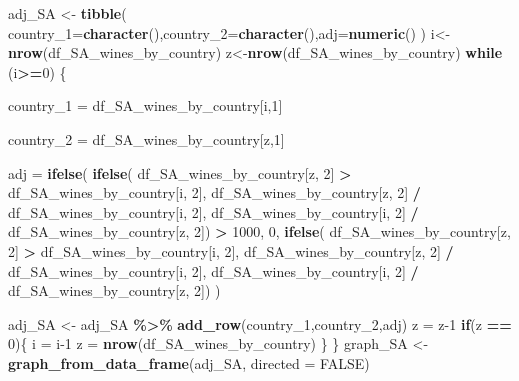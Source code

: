 \documentclass[
]{article}
\newenvironment{Shaded}{\begin{snugshade}}{\end{snugshade}}
\newcommand{\AttributeTok}[1]{\textcolor[rgb]{0.13,0.29,0.53}{#1}}
\newcommand{\ConstantTok}[1]{\textcolor[rgb]{0.56,0.35,0.01}{#1}}
\newcommand{\ControlFlowTok}[1]{\textcolor[rgb]{0.13,0.29,0.53}{\textbf{#1}}}
\newcommand{\DecValTok}[1]{\textcolor[rgb]{0.00,0.00,0.81}{#1}}
\newcommand{\FunctionTok}[1]{\textcolor[rgb]{0.13,0.29,0.53}{\textbf{#1}}}
\newcommand{\NormalTok}[1]{#1}
\newcommand{\OtherTok}[1]{\textcolor[rgb]{0.56,0.35,0.01}{#1}}
\newcommand{\SpecialCharTok}[1]{\textcolor[rgb]{0.81,0.36,0.00}{\textbf{#1}}}
\begin{document}
\begin{Shaded}
\begin{Highlighting}[]
\NormalTok{adj\_SA }\OtherTok{\textless{}{-}} \FunctionTok{tibble}\NormalTok{( }\AttributeTok{country\_1=}\FunctionTok{character}\NormalTok{(),}\AttributeTok{country\_2=}\FunctionTok{character}\NormalTok{(),}\AttributeTok{adj=}\FunctionTok{numeric}\NormalTok{()}
\NormalTok{)}
\NormalTok{i}\OtherTok{\textless{}{-}}\FunctionTok{nrow}\NormalTok{(df\_SA\_wines\_by\_country)}
\NormalTok{z}\OtherTok{\textless{}{-}}\FunctionTok{nrow}\NormalTok{(df\_SA\_wines\_by\_country)}
\ControlFlowTok{while}\NormalTok{ (i}\SpecialCharTok{\textgreater{}=}\DecValTok{0}\NormalTok{) \{}
  
  
\NormalTok{    country\_1 }\OtherTok{=}\NormalTok{ df\_SA\_wines\_by\_country[i,}\DecValTok{1}\NormalTok{]}
    
\NormalTok{    country\_2 }\OtherTok{=}\NormalTok{ df\_SA\_wines\_by\_country[z,}\DecValTok{1}\NormalTok{]}
    
\NormalTok{    adj }\OtherTok{=} 
      \FunctionTok{ifelse}\NormalTok{(      }
        \FunctionTok{ifelse}\NormalTok{(}
\NormalTok{          df\_SA\_wines\_by\_country[z, }\DecValTok{2}\NormalTok{] }\SpecialCharTok{\textgreater{}}\NormalTok{ df\_SA\_wines\_by\_country[i, }\DecValTok{2}\NormalTok{],}
\NormalTok{                 df\_SA\_wines\_by\_country[z, }\DecValTok{2}\NormalTok{] }\SpecialCharTok{/}\NormalTok{ df\_SA\_wines\_by\_country[i, }\DecValTok{2}\NormalTok{],}
\NormalTok{                 df\_SA\_wines\_by\_country[i, }\DecValTok{2}\NormalTok{] }\SpecialCharTok{/}\NormalTok{ df\_SA\_wines\_by\_country[z, }\DecValTok{2}\NormalTok{]) }\SpecialCharTok{\textgreater{}} \DecValTok{1000}\NormalTok{,}
        \DecValTok{0}\NormalTok{, }
        \FunctionTok{ifelse}\NormalTok{(}
\NormalTok{          df\_SA\_wines\_by\_country[z, }\DecValTok{2}\NormalTok{] }\SpecialCharTok{\textgreater{}}\NormalTok{ df\_SA\_wines\_by\_country[i, }\DecValTok{2}\NormalTok{],}
\NormalTok{                 df\_SA\_wines\_by\_country[z, }\DecValTok{2}\NormalTok{] }\SpecialCharTok{/}\NormalTok{ df\_SA\_wines\_by\_country[i, }\DecValTok{2}\NormalTok{],}
\NormalTok{                 df\_SA\_wines\_by\_country[i, }\DecValTok{2}\NormalTok{] }\SpecialCharTok{/}\NormalTok{ df\_SA\_wines\_by\_country[z, }\DecValTok{2}\NormalTok{])}
\NormalTok{      )}
    
 

\NormalTok{adj\_SA }\OtherTok{\textless{}{-}}\NormalTok{ adj\_SA }\SpecialCharTok{\%\textgreater{}\%} \FunctionTok{add\_row}\NormalTok{(country\_1,country\_2,adj)}
\NormalTok{    z }\OtherTok{=}\NormalTok{ z}\DecValTok{{-}1}
  \ControlFlowTok{if}\NormalTok{(z }\SpecialCharTok{==} \DecValTok{0}\NormalTok{)\{}
\NormalTok{    i }\OtherTok{=}\NormalTok{ i}\DecValTok{{-}1}
\NormalTok{    z }\OtherTok{=} \FunctionTok{nrow}\NormalTok{(df\_SA\_wines\_by\_country)}
\NormalTok{  \}}
\NormalTok{\}}
\NormalTok{graph\_SA }\OtherTok{\textless{}{-}} \FunctionTok{graph\_from\_data\_frame}\NormalTok{(adj\_SA, }\AttributeTok{directed =} \ConstantTok{FALSE}\NormalTok{)}


\end{Highlighting}
\end{Shaded}
\end{document}
